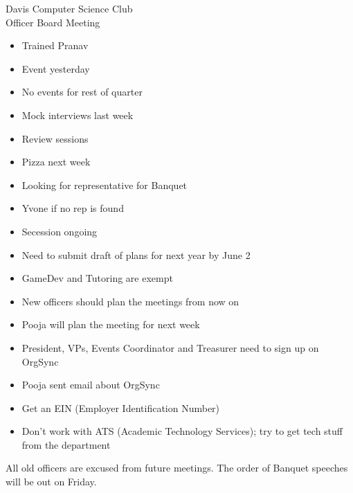 \documentclass{article}
\begin{document}
\begin{Minutes}{Davis Computer Science Club\\Officer Board Meeting}

\begin{itemize}
\item Trained Pranav
\end{itemize}

\begin{itemize}
\item Event yesterday
\item No events for rest of quarter
\item Mock interviews last week
\end{itemize}

\begin{itemize}
\item Review sessions
\item Pizza next week
\end{itemize}

\begin{itemize}
\item Looking for representative for Banquet
\item Yvone if no rep is found
\item Secession ongoing
\end{itemize}

\begin{itemize}
\item Need to submit draft of plans for next year by June 2
\item GameDev and Tutoring are exempt
\end{itemize}

\begin{itemize}
\item New officers should plan the meetings from now on
\item Pooja will plan the meeting for next week
\item President, VPs, Events Coordinator and Treasurer need to sign up on OrgSync
\item Pooja sent email about OrgSync
\item Get an EIN (Employer Identification Number)
\item Don't work with ATS (Academic Technology Services); try to get tech stuff from the department
\end{itemize}

All old officers are excused from future meetings.
The order of Banquet speeches will be out on Friday.
\end{Minutes}
\thispagestyle{creditfooter}
\end{document}
